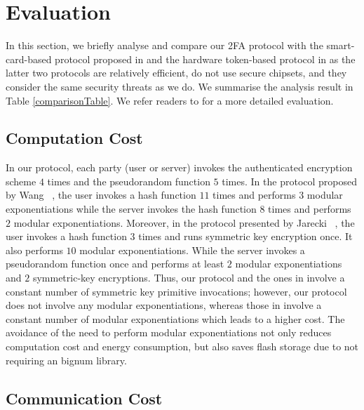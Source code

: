 
\section{Evaluation}\label{sec:eval}

In this section, we briefly analyse and compare our 2FA protocol with the smart-card-based protocol proposed in  \cite{WangW18} and the hardware token-based protocol in \cite{JareckiJKSS21} as the latter two protocols are relatively efficient, do not use secure chipsets, and they consider the same security threats as we do. We summarise the analysis result in Table \ref{comparisonTable}. We refer readers to  for a more detailed evaluation. 




\subsection{Computation Cost}
In our protocol, each party (user or server) invokes the authenticated encryption scheme $4$ times and the pseudorandom function $5$ times. In the protocol proposed by Wang \etal~\cite{WangW18}, the user invokes a hash function $11$ times and performs $3$ modular exponentiations while the server invokes the hash function $8$ times and performs $2$ modular exponentiations. Moreover, in the protocol presented by Jarecki \etal~\cite{JareckiJKSS21}, the user invokes a hash function $3$ times and runs symmetric key encryption once. It also performs $10$ modular exponentiations. While the server invokes a pseudorandom function once and performs at least $2$ modular exponentiations and $2$ symmetric-key encryptions. Thus,  our protocol and the ones in \cite{WangW18,JareckiJKSS21} involve a constant number of symmetric key primitive invocations; however, our protocol does not involve any modular exponentiations, whereas those in  \cite{WangW18,JareckiJKSS21} involve a constant number of modular exponentiations which leads to a higher cost. 
The avoidance of the need to perform modular exponentiations not only reduces computation cost and energy consumption, but also saves flash storage due to not requiring an bignum library.

\subsection{Communication Cost}

